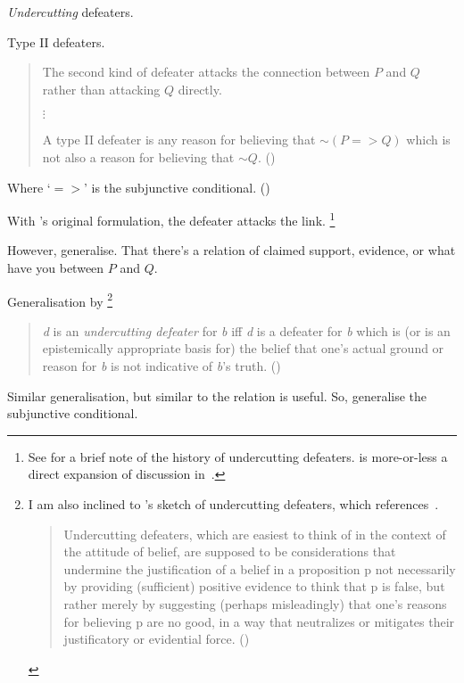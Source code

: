 \begin{note}
  \emph{Undercutting} defeaters.

  Type II defeaters.

  \begin{quote}
    The second kind of defeater attacks the connection between \(P\) and \(Q\) rather than attacking \(Q\) directly.

    \mbox{}\hfill\(\vdots\)\hfill\mbox{}

    A type II defeater is any reason for believing that \({\sim}(P => Q)\) which is not also a reason for believing that \({\sim}Q\).\nolinebreak
    \mbox{}\hfill\mbox{(\cite[43]{Pollock:1974uk})}
  \end{quote}
  Where `\(=>\)' is the subjunctive conditional. (\Citeyear[42]{Pollock:1974uk})

  With \citeauthor{Pollock:1974uk}'s original formulation, the defeater attacks the link.\nolinebreak
  \footnote{
    See \textcite[196,fn.166]{Pollock:1999tm} for a brief note of the history of undercutting defeaters.
    \textcite{Pollock:1974uk} is more-or-less a direct expansion of discussion in~\textcite{Pollock:1970un}.
  }

  However, generalise.
  That there's a relation of claimed support, evidence, or what have you between \(P\) and \(Q\).

  Generalisation by \citeauthor{Bergmann:2005ws}\nolinebreak
  \footnote{
    I am also inclined to \citeauthor{Worsnip:2018aa}'s sketch of undercutting defeaters, which references~\citeauthor{Bergmann:2005ws}.
    \begin{quote}
      Undercutting defeaters, which are easiest to think of in the context of the attitude of belief, are supposed to be considerations that undermine the justification of a belief in a proposition p not necessarily by providing (sufficient) positive evidence to think that p is false, but rather merely by suggesting (perhaps misleadingly) that one’s reasons for believing p are no good, in a way that neutralizes or mitigates their justificatory or evidential force.\linebreak
      \mbox{}\hfill\mbox{(\Citeyear[29]{Worsnip:2018aa})}
    \end{quote}
  }
  \begin{quote}
    \emph{d} is an \emph{undercutting defeater} for \emph{b} iff \emph{d} is a defeater for \emph{b} which is (or is an epistemically appropriate basis for) the belief that one's actual ground or reason for \emph{b} is not indicative of \emph{b}'s truth.\newline
    \mbox{}\hfill\mbox{(\citeyear[424]{Bergmann:2005ws})}
  \end{quote}

  Similar generalisation, but similar to \citeauthor{Pollock:1974uk} the relation is useful.
  So, generalise the subjunctive conditional.
\end{note}


